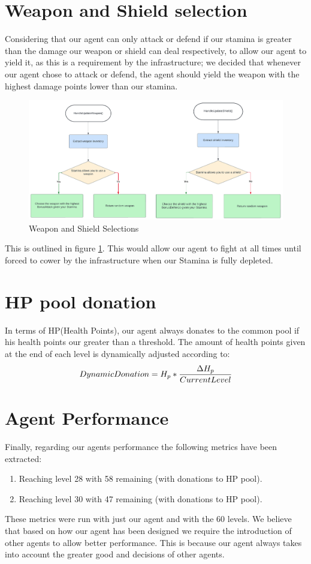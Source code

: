 \section{Weapon and Shield selection}
Considering that our agent can only attack or defend if our stamina is greater than the damage our weapon or shield can deal respectively, to allow our agent to yield it, as this is a requirement by the infrastructure; we decided that whenever our agent chose to attack or defend, the agent should yield the weapon with the highest damage points lower than our stamina. 
\begin{figure}[!ht]
    \centering
    \includegraphics[width=0.6\linewidth]{005_team_2_agent_design/Resources/handleUpdate.png}
    \caption{Weapon and Shield Selections}
    \label{fig:handleUpdate}
\end{figure}

This is outlined in figure \ref{fig:handleUpdate}. This would allow our agent to fight at all times until forced to cower by the infrastructure when our Stamina is fully depleted.

\section{HP pool donation}In terms of HP(Health Points), our agent always donates to the common pool if his health points our greater than a threshold. The amount of health points given at the end of each level is dynamically adjusted according to: 
\begin{equation}
\begin{aligned}[b]
Dynamic \space Donation = H_p * \frac{\Delta H_p}{CurrentLevel}
\end{aligned}
\end{equation}


\section{Agent Performance}
Finally, regarding our agents performance the following metrics have been extracted:
\begin{enumerate}
    \item Reaching level 28 with 58 remaining (with donations to HP pool).
    \item Reaching level 30 with 47 remaining (with donations to HP pool).
\end{enumerate}
These metrics were run with just our agent and with the 60 levels. We believe that based on how our agent has been designed we require the introduction of other agents to allow better performance. This is because our agent always takes into account the greater good and decisions of other agents.